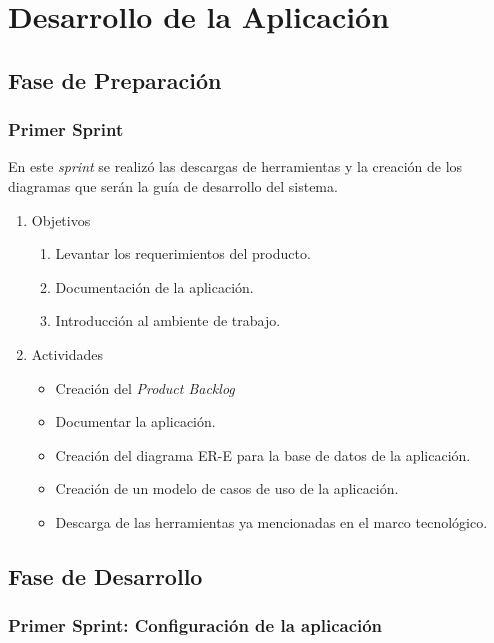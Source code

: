\chapter{Desarrollo de la Aplicación}

\section{Fase de Preparación}
    \subsection{Primer Sprint}
    
    En este \textit{sprint} se realizó las descargas de herramientas y la creación de los diagramas que serán la guía de desarrollo del sistema.
    
    \begin{enumerate}
        \item Objetivos
        \begin{enumerate}
            \item Levantar los requerimientos del producto.
            \item Documentación de la aplicación.
            \item Introducción al ambiente de trabajo.
        \end{enumerate}
        \item Actividades
        \begin{itemize}
            \item Creación del \textit{Product Backlog}
            \item Documentar la aplicación.
            \item Creación del diagrama ER-E para la base de datos de la aplicación.
            \item Creación de un modelo de casos de uso de la aplicación.
            \item Descarga de las herramientas ya mencionadas en el marco tecnológico.
        \end{itemize}
    \end{enumerate}
        
\section{Fase de Desarrollo}
    
    \subsection{Primer Sprint: Configuración de la aplicación}
    
